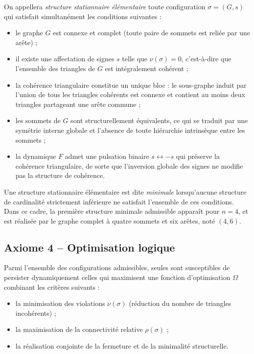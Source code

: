 \documentclass[11pt,a4paper]{article}
\begin{document}
On appellera \emph{structure stationnaire élémentaire} toute configuration \(\sigma = \left(G,s\right)\) qui satisfait simultanément les conditions suivantes :
\begin{itemize}
  \item le graphe \(G\) est connexe et complet (toute paire de sommets est reliée par une arête) ;
  \item il existe une affectation de signes \(s\) telle que \(\nu\left(\sigma\right) = 0\), c’est-à-dire que l’ensemble des triangles de \(G\) est intégralement cohérent ;
  \item la cohérence triangulaire constitue un unique bloc : le sous-graphe induit par l’union de tous les triangles cohérents est connexe et contient au moins deux triangles partageant une arête commune ;
  \item les sommets de \(G\) sont structurellement équivalents, ce qui se traduit par une symétrie interne globale et l’absence de toute hiérarchie intrinsèque entre les sommets ;
  \item la dynamique \(F\) admet une pulsation binaire \(s \leftrightarrow -s\) qui préserve la cohérence triangulaire, de sorte que l’inversion globale des signes ne modifie pas la structure de cohérence.
\end{itemize}

Une structure stationnaire élémentaire est dite \emph{minimale} lorsqu’aucune structure de cardinalité strictement inférieure ne satisfait l’ensemble de ces conditions. Dans ce cadre, la première structure minimale admissible apparaît pour \(n = 4\), et est réalisée par le graphe complet à quatre sommets et six arêtes, noté \(\left(4,6\right)\).

\subsection*{Axiome 4 – Optimisation logique}

Parmi l’ensemble des configurations admissibles, seules sont susceptibles de persister dynamiquement celles qui maximisent une fonction d’optimisation \(\Omega\) combinant les critères suivants :
\begin{itemize}
  \item la minimisation des violations \(\nu\left(\sigma\right)\) (réduction du nombre de triangles incohérents) ;
  \item la maximisation de la connectivité relative \(\rho\left(\sigma\right)\) ;
  \item la réalisation conjointe de la fermeture et de la minimalité structurelle.
\end{itemize}
\end{document}
